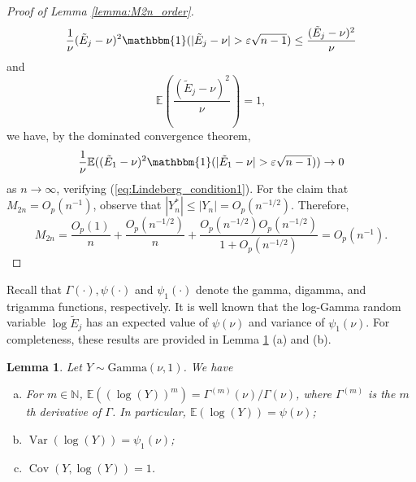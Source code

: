 \documentclass[12pt,letterpaper, twoside, openany]{article}
\DeclareMathOperator*{\Var}{Var}
\DeclareMathOperator*{\Cov}{Cov}
\theoremstyle{plain}
\newtheorem{lemma}[theorem]{Lemma}
\begin{document}
\begin{proof}[Proof of Lemma \ref{lemma:M2n_order}]
\begin{equation*}
	\frac{1}{\nu} (\tilde{E}_j - \nu)^2\mathbbm{1}(|\tilde{E}_j - \nu| > \varepsilon \sqrt{n-1}) \leq \frac{(\tilde{E}_j - \nu)^2}{\nu}
\end{equation*}
and 
\begin{equation*}
	\mathbb{E}\left(\frac{(\tilde{E}_j - \nu)^2}{\nu}\right) = 1,
\end{equation*}
we have, by the dominated convergence theorem,
\begin{equation*}
	\frac{1}{\nu}\mathbb{E}((\tilde{E}_1 - \nu)^2 \mathbbm{1}(|\tilde{E}_1 - \nu| > \varepsilon \sqrt{n-1})) \rightarrow 0
\end{equation*}
as $n \rightarrow \infty$, verifying (\ref{eq:Lindeberg_condition1}).
For the claim that $M_{2n} = O_p(n^{-1})$, observe that $|Y^*_n| \leq |Y_n| = O_p(n^{-1/2})$. Therefore,
\begin{equation*}
	M_{2n} = \frac{O_p(1)}{n} + \frac{O_p(n^{-1/2})}{n} + \frac{O_p(n^{-1/2})O_p(n^{-1/2})}{1 + O_p(n^{-1/2})} = O_p(n^{-1}).
\end{equation*}
\end{proof}




Recall that $\Gamma(\cdot), \psi(\cdot)$ and $\psi_1(\cdot)$ denote the gamma, digamma, and trigamma functions, respectively.
It is well known that the log-Gamma random variable $\log \tilde{E}_j$ has an expected value of $\psi(\nu)$ and variance of $\psi_1(\nu)$. For completeness, these results are provided in Lemma \ref{lemma:log_gamma_moments} (a) and (b).
\begin{lemma}\label{lemma:log_gamma_moments}
Let $Y \sim \text{Gamma}(\nu, 1)$. We have
\begin{enumerate}[(a)]
    \item For $m \in \mathbb{N}$, $\mathbb{E}( (\log (Y))^m) = \Gamma^{(m)}(\nu)/\Gamma(\nu)$, where $\Gamma^{(m)}$ is the $m$th derivative of $\Gamma$. In particular, $\mathbb{E}(\log (Y)) = \psi(\nu)$;
    \item $\Var(\log(Y)) = \psi_1(\nu)$;
    \item $\Cov(Y, \log (Y)) = 1$.
\end{enumerate}
\end{lemma}
\end{document}
